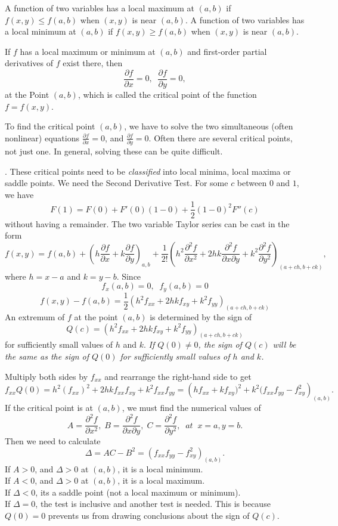 \documentclass{article}
\begin{document}
\bigskip


A function of two variables has a local maximum at $(a,b)$ if
$f(x,y)\le f(a,b)$ when $(x,y)$ is near $(a,b)$. A function of two
variables has a local minimum at $(a,b)$ if $f(x,y)\ge f(a,b)$
when $(x,y)$ is near $(a,b)$.

If $f$ has a local maximum or minimum at $(a,b)$ and first-order
partial derivatives of $f$ exist there, then
$$
\frac{\partial f}{\partial x}=0, \;\;  \frac{\partial f}{\partial
y}=0,
$$
at the Point $(a,b)$,
which is called the critical point of the function $f=f(x,y)$.


To find the critical point $(a,b)$, 
we have to solve the two simultaneous
(often nonlinear) equations  ${{\frac{\partial f}{\partial
x}}}=0$, and ${{\frac{\partial f}{\partial y}}}=0$. Often
there are several critical points, not just one. In general,
solving these can be quite difficult.

\bigskip

. These critical points need to be {\it classified} into local
minima, local maxima or saddle points. We need the Second
Derivative Test.  
For some $c$ between $0$ and $1$, we have 
$$
F(1)=F(0)+F'(0)(1-0)+\frac{1}{2} (1-0)^2 F''(c)
$$
without having a remainder.
The two variable Taylor series can be cast in the form
$$
f(x,y)=f(a,b)+ \left( h \frac{\partial f}{\partial x} + k
\frac{\partial f}{\partial y} \right)_{a,b} + \frac{1}{2!} \left( h^2
\frac{\partial^2 f}{\partial x^2} + 2hk \frac{\partial^2
f}{\partial x \partial y} + k^2 \frac{\partial^2 f}{\partial
y^2}\right)_{(a+ch,b+ck)},
$$
where $h=x-a$ and $k=y-b$.
Since
$$
f_x(a,b)=0, \;\; f_y(a,b)=0
$$
$$
f(x,y)-f(a,b)=\frac{1}{2} \left(h^2f_{xx}+2hk
f_{xy}+k^2f_{yy}\right)_{(a+ch,b+ck)}
$$
An extremum of $f$ at the point $(a,b)$ is determined by  the sign of
$$
Q(c)= \left(h^2f_{xx}+2hk f_{xy}+k^2f_{yy}\right)_{(a+ch,b+ck)}
$$
for sufficiently small values of $h$ and $k$. 
{\it If $Q(0) \ne 0$, the sign of $Q(c)$ will be the same as the sign of $Q(0)$
for sufficiently small values of $h$ and $k$. }


Multiply both sides by $f_{xx}$ and rearrange the right-hand side to get
$$
f_{xx} Q(0) =h^2(f_{xx})^2 +2hk f_{xx} f_{xy}+k^2 f_{xx}f_{yy}=
\left(hf_{xx}+kf_{xy})^2 + k^2(f_{xx} f_{yy}- f_{xy}^2 \right)_{(a,b)}.
$$
If the critical point is at $(a,b)$, we must find the numerical
values of
$$
A= { {\frac{\partial^2 f}{\partial x^2}}}, \;  B= {
{\frac{\partial^2 f}{\partial x
\partial y}}}, \;  C= { {\frac{\partial^2 f}{\partial
y^2}}}, \;\; at \;\; x=a, y=b.
$$
Then we need to calculate
$$
\Delta = AC-B^2=\left(f_{xx} f_{yy}- f_{xy}^2 \right)_{(a,b)}.
$$
If $A>0$, and $\Delta>0$ at $(a,b)$, it is a local minimum. \\
If $A<0$, and $\Delta>0$  at $(a,b)$,  it is  a local maximum. \\
If $\Delta<0$, its a saddle point (not a local maximum or minimum).\\
If $\Delta=0$, the test is inclusive and another test is needed. This is because
$Q(0)=0$ prevents us from drawing conclusions about the sign of $Q(c)$.
\end{document}
